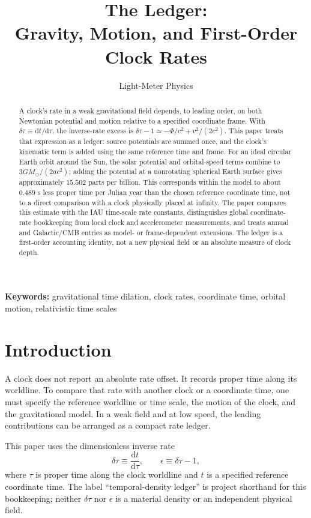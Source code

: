 \documentclass[12pt]{article}
\title{The Ledger:\\
Gravity, Motion, and First-Order Clock Rates}
\author{Light-Meter Physics}
\date{}
\begin{document}
\maketitle

\begin{abstract}
A clock's rate in a weak gravitational field depends, to leading order, on both Newtonian potential and motion relative to a specified coordinate frame. With $\delta\tau\equiv\mathrm{d}t/\mathrm{d}\tau$, the inverse-rate excess is $\delta\tau-1\simeq-\Phi/c^2+v^2/(2c^2)$. This paper treats that expression as a ledger: source potentials are summed once, and the clock's kinematic term is added using the same reference time and frame. For an ideal circular Earth orbit around the Sun, the solar potential and orbital-speed terms combine to $3GM_{\odot}/(2ac^2)$; adding the potential at a nonrotating spherical Earth surface gives approximately $15.502$ parts per billion. This corresponds within the model to about $0.489$ s less proper time per Julian year than the chosen reference coordinate time, not to a direct comparison with a clock physically placed at infinity. The paper compares this estimate with the IAU time-scale rate constants, distinguishes global coordinate-rate bookkeeping from local clock and accelerometer measurements, and treats annual and Galactic/CMB entries as model- or frame-dependent extensions. The ledger is a first-order accounting identity, not a new physical field or an absolute measure of clock depth.
\end{abstract}

\noindent\textbf{Keywords:} gravitational time dilation, clock rates, coordinate time, orbital motion, relativistic time scales

\section{Introduction}

A clock does not report an absolute rate offset. It records proper time along its worldline. To compare that rate with another clock or a coordinate time, one must specify the reference worldline or time scale, the motion of the clock, and the gravitational model. In a weak field and at low speed, the leading contributions can be arranged as a compact rate ledger.

This paper uses the dimensionless inverse rate
\begin{equation}
  \delta\tau\equiv\frac{\mathrm{d}t}{\mathrm{d}\tau},
  \qquad
  \epsilon\equiv\delta\tau-1,
  \label{eq:inverse-rate}
\end{equation}
where $\tau$ is proper time along the clock worldline and $t$ is a specified reference coordinate time. The label ``temporal-density ledger'' is project shorthand for this bookkeeping; neither $\delta\tau$ nor $\epsilon$ is a material density or an independent physical field.
\end{document}
